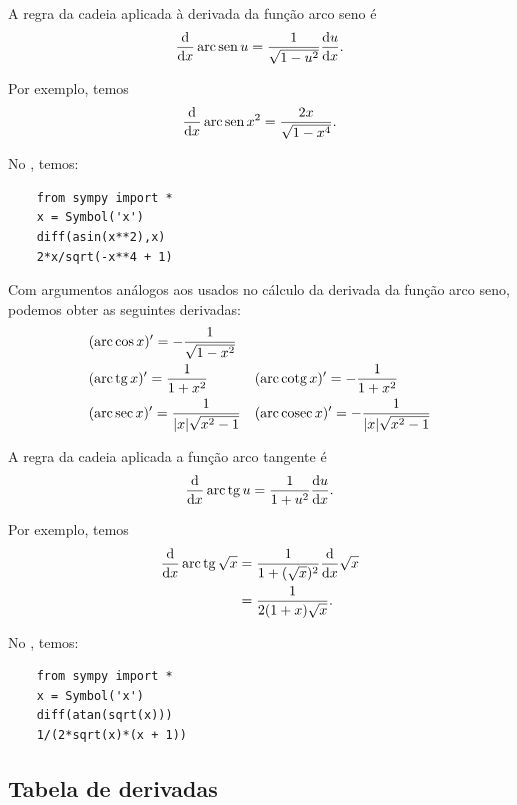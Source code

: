 \begin{ex}
  A regra da cadeia aplicada à derivada da função arco seno é
  \begin{equation}
    \frac{\mathrm{d}}{\mathrm{d} x}\operatorname{arc}\operatorname{sen} u = \frac{1}{\sqrt{1-u^2}}\frac{\mathrm{d} u}{\mathrm{d} x}.
  \end{equation}

  Por exemplo, temos
  \begin{equation}
    \frac{\mathrm{d}}{\mathrm{d} x}\operatorname{arc}\operatorname{sen} x^2 = \frac{2x}{\sqrt{1-x^4}}.
  \end{equation}

  \ifispython
  No \sympy, temos:
  \begin{lstlisting}
    from sympy import *
    x = Symbol('x')
    diff(asin(x**2),x)
    2*x/sqrt(-x**4 + 1)
  \end{lstlisting}
  \fi    
\end{ex}

Com argumentos análogos aos usados no cálculo da derivada da função arco seno, podemos obter as seguintes derivadas:
\begin{align}
  & (\operatorname{arc}\cos x)' = -\frac{1}{\sqrt{1-x^2}} && \\
  &(\operatorname{arc}\operatorname{tg} x)' = \frac{1}{1+x^2} && (\operatorname{arc}\operatorname{cotg} x)' = -\frac{1}{1+x^2} \\
  & (\operatorname{arc}\sec x)' = \frac{1}{|x|\sqrt{x^2-1}} && (\operatorname{arc}\operatorname{cosec} x)' = -\frac{1}{|x|\sqrt{x^2-1}}
\end{align}

\begin{ex}
  A regra da cadeia aplicada a função arco tangente é
  \begin{equation}
    \frac{\mathrm{d}}{\mathrm{d} x}\operatorname{arc}\operatorname{tg} u = \frac{1}{1+u^2}\frac{\mathrm{d} u}{\mathrm{d} x}.
  \end{equation}

  Por exemplo, temos
  \begin{align}
    \frac{\mathrm{d}}{\mathrm{d} x}\operatorname{arc}\operatorname{tg}\sqrt{x} &= \frac{1}{1+(\sqrt{x})^2}\frac{\mathrm{d}}{\mathrm{d} x}\sqrt{x} \\
                                     &=  \frac{1}{2(1+x)\sqrt{x}}.
  \end{align}

  \ifispython
  No \sympy, temos:
  \begin{lstlisting}
    from sympy import *
    x = Symbol('x')
    diff(atan(sqrt(x)))
    1/(2*sqrt(x)*(x + 1))
  \end{lstlisting}
  \fi    
\end{ex}

\subsection{Tabela de derivadas}\label{deriv_tabela_de_derivadas}

